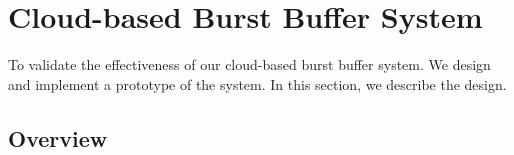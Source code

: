 \section{Cloud-based Burst Buffer System}
\label{sec:architecture}
To validate the effectiveness of our cloud-based burst buffer system.
We design and implement a prototype of the system. In this section, we describe
the design.
\subsection{Overview}

